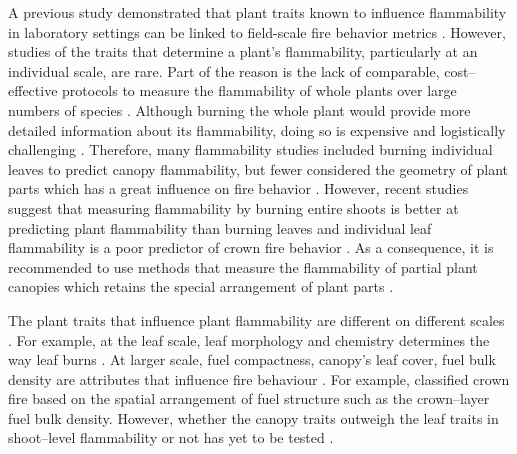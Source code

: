 \documentclass{bmcart}
\begin{document}
A previous study demonstrated that plant traits known to influence flammability in laboratory settings can be linked to field-scale fire behavior metrics \citep{tumino2019plant}. However, studies of the traits that determine a plant's flammability, particularly at an individual scale, are rare. Part of the reason is the lack of comparable, cost--effective protocols to measure the flammability of whole plants over large numbers of species \citep{jaureguiberry2011device}. Although burning the whole plant would provide more detailed information about its flammability, doing so is expensive and logistically challenging \citep{jaureguiberry2011device, pausasandmoi2012flammability}. Therefore, many flammability studies included burning individual leaves to predict canopy flammability, but fewer considered the geometry of plant parts which has a great influence on fire behavior \citep{madrigal2012evaluation, pausas2012firesulex, calitz2015investigating, gao2018grass}. However, recent studies suggest that measuring flammability by burning entire shoots is better at predicting plant flammability than burning leaves \citep{alam2020shoot} and individual leaf flammability is a poor predictor of crown fire behavior \citep{fernandes2012plant}. As a consequence, it is recommended to use methods that measure the flammability of partial plant canopies which retains the special arrangement of plant parts \citep{schwilk2015dimensions, perez2016corrigendum}.



The plant traits that influence plant flammability are different on different scales \citep{pausas2017flammability}. For example, at the leaf scale, leaf morphology and chemistry determines the way leaf burns \citep{anderson1970forest, owens1998seasonal, schwilk2011scaling, pausas2016secondary, guerrero2021leaf, ganteaume2021volatile,alam2020shoot}. At larger scale, fuel compactness, canopy's leaf cover, fuel bulk density are attributes that influence fire behaviour \citep{ ray2005micrometeorological, tachajapong2008investigation, madrigal2012evaluation}. For example, \citet{wagner1977conditions} classified crown fire based on the spatial arrangement of fuel structure such as the crown--layer fuel bulk density. However, whether the canopy traits outweigh the leaf traits in shoot--level flammability or not  has yet to be tested \citep{alam2020shoot}.
\end{document}
